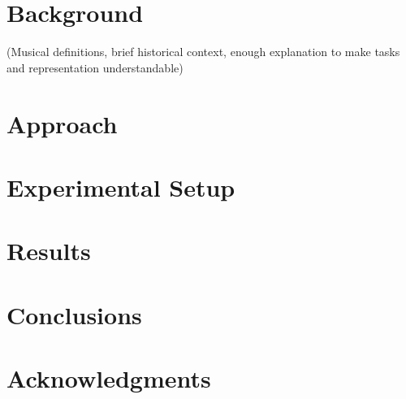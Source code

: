 \documentclass{article}
\begin{document}
\begin{multicols}{2}
	\section{Background}
    (Musical definitions, brief historical context, enough explanation to make tasks and representation understandable)
    \section{Approach}
	\section{Experimental Setup}



	\section{Results}


	\section{Conclusions}

    \section{Acknowledgments}
	{}
	
    \end{multicols}
\end{document}
